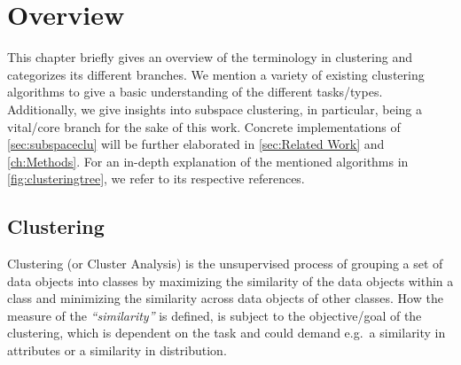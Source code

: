 \chapter{Overview}\label{ch:overview}

This chapter briefly gives an overview of the terminology in clustering and categorizes its different branches. We mention a variety of existing clustering algorithms to give a basic understanding of the different tasks/types. Additionally, we give insights into subspace clustering, in particular, being a vital/core branch for the sake of this work. Concrete implementations of \autoref{sec:subspaceclu} will be further elaborated in \autoref{sec:Related Work} and \autoref{ch:Methods}. For an in-depth explanation of the mentioned algorithms in \autoref{fig:clusteringtree}, we refer to its respective references.

\section{Clustering}\label{sec:clu}
Clustering (or Cluster Analysis) is the unsupervised process of grouping a set of data objects into classes by maximizing the similarity of the data objects within a class and minimizing the similarity across data objects of other classes. How the measure of the \textit{``similarity''} is defined, is subject to the objective/goal of the clustering, which is dependent on the task and could demand e.g.\ a similarity in attributes or a similarity in distribution. 

